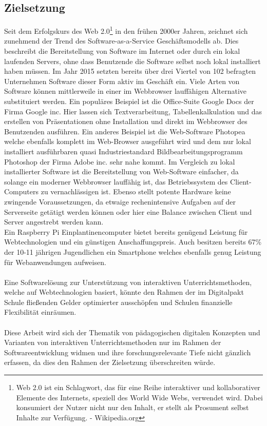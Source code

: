 \subsection{Zielsetzung}\label{sec:zielsetzung}
Seit dem Erfolgskurs des Web 2.0\footnote{Web 2.0 ist ein Schlagwort, das für eine Reihe interaktiver und kollaborativer Elemente des Internets, speziell des World Wide Webs, verwendet wird. Dabei konsumiert der Nutzer nicht nur den Inhalt, er stellt als Prosument selbst Inhalte zur Verfügung. - Wikipedia.org} in den frühen 2000er Jahren, zeichnet sich zunehmend der Trend des Software-as-a-Service Geschäftsmodells ab. Dies beschreibt die Bereitstellung von Software im Internet oder durch ein lokal laufenden Servers, ohne dass Benutzende die Software selbst noch lokal installiert haben müssen. Im Jahr 2015 setzten bereits über drei Viertel von 102 befragten Unternehmen Software dieser Form aktiv im Geschäft ein\cite{TecArt-GmbH2019:online}. Viele Arten von Software können  mittlerweile in einer im Webbrowser lauffähigen Alternative substituiert werden. Ein populäres Beispiel ist die Office-Suite Google Docs der Firma Google inc. Hier lassen sich Textverarbeitung, Tabellenkalkulation und das erstellen von Präsentationen ohne Installation und direkt im Webbrowser des Benutzenden ausführen. Ein anderes Beispiel ist die Web-Software Photopea welche ebenfalls komplett im Web-Browser ausgeführt wird und dem nur lokal installiert ausführbaren quasi Industriestandard Bildbearbeitungsprogramm Photoshop der Firma Adobe inc. sehr nahe kommt. Im Vergleich zu lokal installierter Software ist die Bereitstellung von Web-Software einfacher, da solange ein moderner Webbrowser lauffähig ist, das Betriebssystem des Client-Computers zu vernachlässigen ist. Ebenso stellt potente Hardware keine zwingende Voraussetzungen, da etwaige rechenintensive Aufgaben auf der Serverseite getätigt werden können oder hier eine Balance zwischen Client und Server angestrebt werden kann. \\ 
Ein Raspberry Pi Einplantinencomputer bietet bereits genügend Leistung für Webtechnologien und ein günstigen Anschaffungspreis. Auch besitzen bereits 67\% der 10-11 jährigen Jugendlichen ein Smartphone \cite{Statista2017:online} welches ebenfalls genug Leistung für Webanwendungen aufweisen. \\ \\ Eine Softwarelösung zur Unterstützung von interaktiven Unterrichtsmethoden, welche auf Webtechnologien basiert, könnte den Rahmen der im Digitalpakt Schule fließenden Gelder optimierter ausschöpfen und Schulen finanzielle Flexibilität einräumen. 
\\ \\
Diese Arbeit wird sich der Thematik von pädagogischen digitalen Konzepten und Varianten von interaktiven Unterrichtsmethoden nur im Rahmen der Softwareentwicklung widmen und ihre forschungsrelevante Tiefe nicht gänzlich erfassen, da dies den Rahmen der Zielsetzung überschreiten würde.


